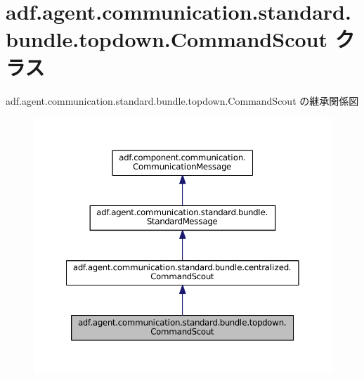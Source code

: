 \hypertarget{classadf_1_1agent_1_1communication_1_1standard_1_1bundle_1_1topdown_1_1CommandScout}{}\section{adf.\+agent.\+communication.\+standard.\+bundle.\+topdown.\+Command\+Scout クラス}
\label{classadf_1_1agent_1_1communication_1_1standard_1_1bundle_1_1topdown_1_1CommandScout}


adf.\+agent.\+communication.\+standard.\+bundle.\+topdown.\+Command\+Scout の継承関係図
\nopagebreak
\begin{figure}[H]
\begin{center}
\leavevmode
\includegraphics[width=350pt]{classadf_1_1agent_1_1communication_1_1standard_1_1bundle_1_1topdown_1_1CommandScout__inherit__graph}
\end{center}
\end{figure}


